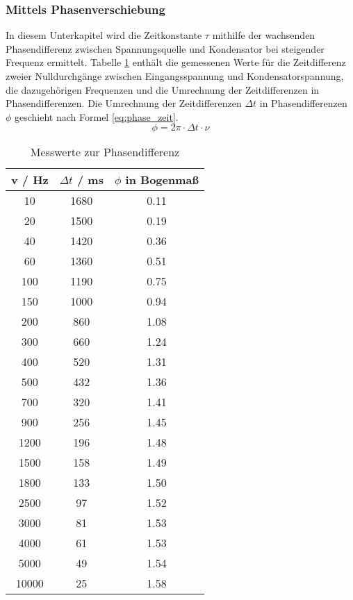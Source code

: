 \subsubsection{Mittels Phasenverschiebung}
In diesem Unterkapitel wird die Zeitkonstante $\tau$ mithilfe der wachsenden Phasendifferenz zwischen Spannungsquelle und Kondensator bei steigender Frequenz ermittelt.
Tabelle \ref{tab:messwerte_phase} enthält die gemessenen Werte für die
Zeitdifferenz zweier Nulldurchgänge zwischen Eingangsspannung und
Kondensatorspannung, die dazugehörigen Frequenzen und die Umrechnung der
Zeitdifferenzen in Phasendifferenzen. Die Umrechnung der Zeitdifferenzen
$\Delta t$ in Phasendifferenzen $\phi$ geschieht nach Formel
\eqref{eq:phase_zeit}.
%
\begin{equation}
  \label{eq:phase_zeit}
  \phi = 2 \pi \cdot \Delta t \cdot \nu
\end{equation}
%
\begin{table}
  \centering
  \begin{tabular}{c|c|c}
    \toprule
    v / Hz & $\Delta t$ / ms  & $\phi$ in Bogenmaß \\
    \midrule
     10 & 1680& 0.11 \\
     20 & 1500& 0.19\\
     40 & 1420& 0.36\\
     60 & 1360& 0.51\\
    100 & 1190& 0.75\\
    150 & 1000& 0.94\\
    200& 860& 1.08\\
    300 & 660& 1.24\\
    400 & 520& 1.31\\
    500 & 432& 1.36\\
    700 & 320& 1.41\\
    900 & 256& 1.45\\
   1200 & 196& 1.48\\
   1500 & 158& 1.49\\
   1800 & 133& 1.50\\
   2500 & 97& 1.52\\
   3000 & 81& 1.53\\
   4000 & 61& 1.53\\
   5000 & 49& 1.54\\
  10000 & 25& 1.58\\
 \bottomrule
  \end{tabular}
  \caption{Messwerte zur Phasendifferenz}
  \label{tab:messwerte_phase}
\end{table}
